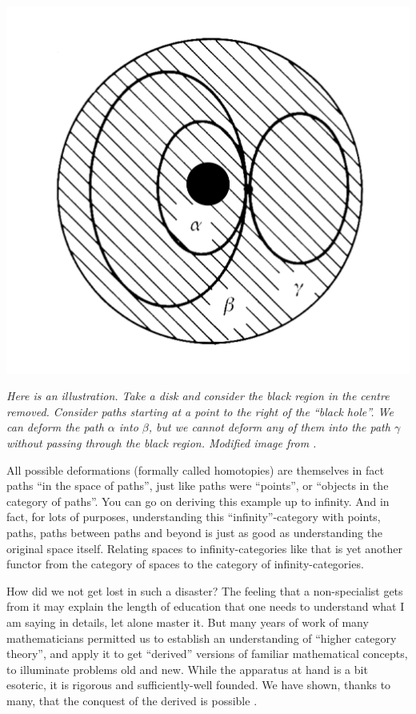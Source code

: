 \documentclass{article}
\begin{document}
\begin{center}
\includegraphics[scale=0.5]{paths}

\textit{Here is an illustration. Take a disk and consider the black region in the centre removed. Consider paths starting at a point to the right of the ``black hole''. We can deform the path $\alpha$  into $\beta$, but we cannot deform any of them into the path $\gamma$ without passing through the black region. Modified image from \cite{NAKAHARA}.}
\end{center}

All possible deformations (formally called homotopies) are themselves in fact paths “in the space of paths”, just like paths were “points”, or “objects in the category of paths”. You can go on deriving this example up to infinity. And in fact, for lots of purposes, understanding this “infinity”-category with points, paths, paths between paths and beyond is just as good as understanding the original space itself. Relating spaces to infinity-categories like that is yet another functor from the category of spaces to the category of infinity-categories.

How did we not get lost in such a disaster? The feeling that a non-specialist gets from it may explain the length of education that one needs to understand what I am saying in details, let alone master it. But many years of work of many mathematicians permitted us to establish an understanding of “higher category theory”, and apply it to get “derived” versions of familiar mathematical concepts, to illuminate problems old and new. While the apparatus at hand is a bit esoteric, it is rigorous and sufficiently-well founded. We have shown, thanks to many, that the conquest of the derived is possible \cite{LURIE}.
\end{document}
